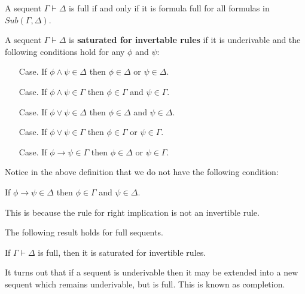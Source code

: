 \documentclass{article}
\begin{document}
\begin{definition}
  \label{def:full_sequent}
  A sequent $\Gamma \vdash \Delta$ is full if and only if it is formula full for all formulas in 
  $Sub(\Gamma,\Delta)$.
\end{definition}

\begin{definition}
  \label{def:sat_for_invert_rules}
  A sequent $\Gamma \vdash \Delta$ is \textbf{saturated for invertable rules} if it is
  underivable and the following conditions hold for any $\phi$ and $\psi$:
    \begin{itemize}
    \item[Case.] If $\phi \land \psi \in \Delta$ then $\phi \in \Delta$ or $\psi \in \Delta$.
    \item[Case.] If $\phi \land \psi \in \Gamma$ then $\phi \in \Gamma$ and $\psi \in \Gamma$.
    \item[Case.] If $\phi \lor \psi \in \Delta$ then $\phi \in \Delta$ and $\psi \in \Delta$.
    \item[Case.] If $\phi \lor \psi \in \Gamma$ then $\phi \in \Gamma$ or $\psi \in \Gamma$.      
    \item[Case.] If $\phi \to \psi \in \Gamma$ then $\phi \in \Delta$ or $\psi \in \Gamma$.      
    \end{itemize}    
\end{definition}
\noindent
Notice in the above definition that we do not have the following condition:
\begin{center}
  If $\phi \to \psi \in \Delta$ then $\phi \in \Gamma$ and $\psi \in \Delta$.      
\end{center}
This is because the rule for right implication is not an invertible rule.  

\noindent
The following result holds for full sequents.
\begin{lemma}[Saturation]
  \label{lemma:saturation}
  If $\Gamma \vdash \Delta$ is full, then it is saturated for invertible rules.
\end{lemma}

It turns out that if a sequent is underivable then it may be extended into a new sequent
which remains underivable, but is full.  This is known as completion. 
\end{document}
